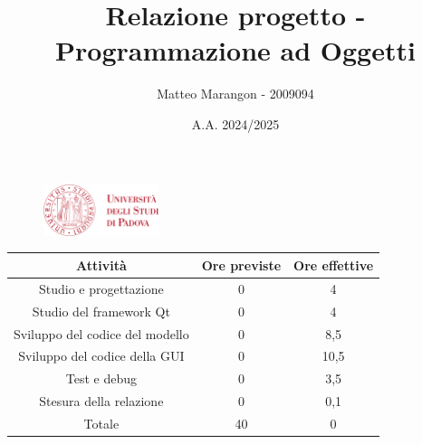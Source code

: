 \documentclass[10pt]{article}
\title{Relazione progetto - Programmazione ad Oggetti}
\author{Matteo Marangon - 2009094}
\date{A.A. 2024/2025}
\begin{document}
\begin{figure}
    \centering
    \includegraphics[width=0.3\textwidth]{./unipdlogo.png}
\end{figure}
\maketitle

\newpage

\tableofcontents
\newpage

\begin{center}
    \begin{tabular}{| c | c | c |} \hline
    Attività & Ore previste & Ore effettive \\\hline
    Studio e progettazione & 0 & 4 \\
    Studio del framework Qt & 0 & 4 \\
    Sviluppo del codice del modello & 0 & 8,5 \\
    Sviluppo del codice della GUI & 0 & 10,5 \\
    Test e debug & 0 & 3,5 \\
    Stesura della relazione & 0 & 0,1 \\\hline
    Totale & 40 & 0 \\\hline
    \end{tabular}
\end{center}
\end{document}
